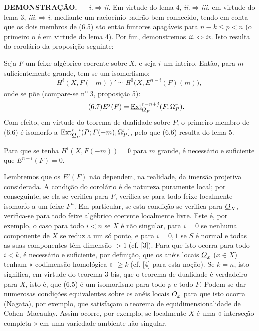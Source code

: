 \noindent\textbf{DEMONSTRAÇÃO.} --- \textit{i.}$\Rightarrow$\textit{ii.} Em
virtude do lema 4, \textit{ii.}$\Rightarrow$\textit{iii.} em virtude do lema 3,
\textit{iii.}$\Rightarrow$\textit{i.} mediante um raciocínio padrão bem conhecido,
tendo em conta que os dois membros de (6.5) são então funtores apagáveis
para $n-k\leq p<n$ (o primeiro o é em virtude do lema 4). Por fim, demonstremos
\textit{ii.}$\Leftrightarrow$\textit{iv.} Isto resulta do corolário da
proposição seguinte:

 Seja $F$ um feixe algébrico coerente sobre $X$, e
seja $i$ um inteiro. Então, para $m$ suficientemente grande, tem-se um isomorfismo:
\begin{equation}\tag{6.6}
  H^{i}(X,F(-m))'
  \simeq H^{0}\bigl(X,E^{n-i}(F)(m)\bigr),
\end{equation}
onde se põe (compare-se n\textsuperscript{o} 3, proposição 5):
\begin{equation}\tag{6.7}
  E^{j}(F)=\underline{\operatorname{Ext}}_{\underline{O}_P}^{r-n+j}(F,\Omega_P^{r}).
\end{equation}
Com efeito, em virtude do teorema de dualidade sobre $P$, o primeiro membro de (6.6)
é isomorfo a
$\operatorname{Ext}_{\underline{O}_P}^{r-i}(P;F(-m),\Omega_P^{r})$, pelo que (6.6) resulta
do lema 5.

 Para que se tenha $H^{i}(X,F(-m))=0$ para $m$ grande, é
necessário e suficiente que $E^{n-i}(F)=0$.

Lembremos que os $E^{j}(F)$ não dependem, na realidade, da imersão projetiva
considerada. A condição do corolário é de natureza puramente local; por conseguinte,
se ela se verifica para $F$, verifica-se para todo feixe localmente
isomorfo a um feixe $F^{n}$. Em particular, se esta condição se verifica
para $\underline{O}_X$, verifica-se para todo feixe algébrico coerente localmente
livre. Este é, por exemplo, o caso para todo $i<n$ se $X$ é não singular, para
$i=0$ se nenhuma componente de $X$ se reduz a um só ponto, e para $i=0,1$
se $S$ é normal e todas as suas componentes têm dimensão $>1$ (cf.
[3]). Para que isto ocorra para todo
$i<k$, é necessário e suficiente, por definição, que os anéis locais
$\underline{O}_x$ ($x\in X$) tenham « codimensão homológica » $\geq k$ (cf. [4]
para esta noção). Se $k=n$, isto significa, em virtude do teorema 3 bis, que o
teorema de dualidade é verdadeiro para $X$, isto é, que (6.5) é um isomorfismo para
todo $p$ e todo $F$. Podem-se dar numerosas condições equivalentes sobre
os anéis locais $\underline{O}_x$ para que isto ocorra (Nagata), por exemplo, que
satisfaçam o teorema de equidimensionalidade de Cohen--Macaulay. Assim ocorre,
por exemplo, se localmente $X$ é uma « interseção completa » em uma
variedade ambiente não singular.

